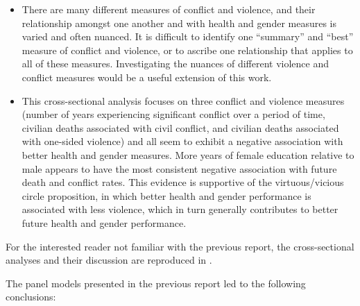 \documentclass[12pt]{article}
\begin{document}
\begin{itemize}
\item There are many different measures of conflict and violence, and their relationship amongst one another and with health and gender measures is varied and often nuanced. It is difficult to identify one \enquote{summary} and \enquote{best} measure of conflict and violence, or to ascribe one relationship that applies to all of these measures. Investigating the nuances of different violence and conflict measures would be a useful extension of this work.
\item This cross-sectional analysis focuses on three conflict and violence measures (number of years experiencing significant conflict over a period of time, civilian deaths associated with civil conflict, and civilian deaths associated with one-sided violence) and all seem to exhibit a negative association with better health and gender measures. More years of female education relative to male appears to have the most consistent negative association with future death and conflict rates. This evidence is supportive of the virtuous/vicious circle proposition, in which better health and gender performance is associated with less violence, which in turn generally contributes to better future health and gender performance.
\end{itemize}

For the interested reader not familiar with the previous report, the cross-sectional analyses and their discussion are reproduced in .

The panel models presented in the previous report led to the following conclusions:
\end{document}

